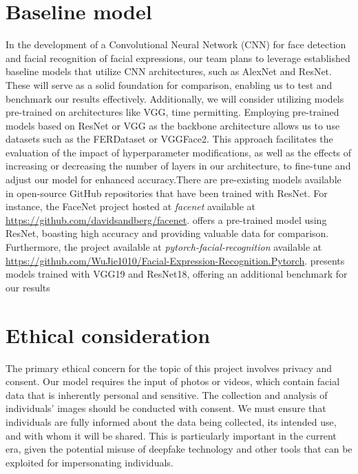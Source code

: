 \documentclass{article} %
\begin{document}
\section{Baseline model}
In the development of a Convolutional Neural Network (CNN) for face detection and facial recognition of facial expressions, our team plans to leverage established baseline models that utilize CNN architectures, such as AlexNet and ResNet. These will serve as a solid foundation for comparison, enabling us to test and benchmark our results effectively. Additionally, we will consider utilizing models pre-trained on architectures like VGG, time permitting. Employing pre-trained models based on ResNet or VGG as the backbone architecture allows us to use datasets such as the FERDataset or VGGFace2. This approach facilitates the evaluation of the impact of hyperparameter modifications, as well as the effects of increasing or decreasing the number of layers in our architecture, to fine-tune and adjust our model for enhanced accuracy.There are pre-existing models available in open-source GitHub repositories that have been trained with ResNet. For instance, the FaceNet project hosted at 
\textit{facenet} \cite{Davidsandberg} available at
\url{https://github.com/davidsandberg/facenet}.
offers a pre-trained model using ResNet, boasting high accuracy and providing valuable data for comparison. Furthermore, the project available at 
\textit{pytorch-facial-recognition} \cite{WuJie1010} available at
\url{https://github.com/WuJie1010/Facial-Expression-Recognition.Pytorch}.
presents models trained with VGG19 and ResNet18, offering an additional benchmark for our results

\section{Ethical consideration}
The primary ethical concern for the topic of this project involves privacy and consent. Our model requires the input of photos or videos, which contain facial data that is inherently personal and sensitive. The collection and analysis of individuals’ images should be conducted with consent. We must ensure that individuals are fully informed about the data being collected, its intended use, and with whom it will be shared. This is particularly important in the current era, given the potential misuse of deepfake technology and other tools that can be exploited for impersonating individuals.
\end{document}
